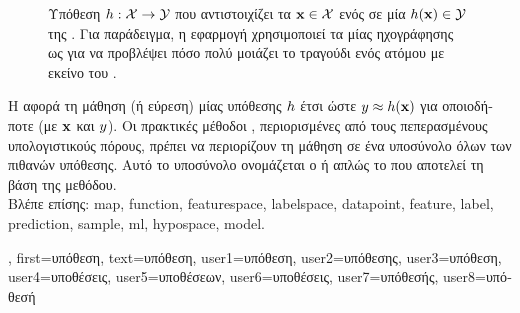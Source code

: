 {{\begin{figure}[H]
		{
		\caption{\label{fig:hypothesis_dict} \foreignlanguage{greek}{Υπόθεση $h: \mathcal{X} \rightarrow \mathcal{Y}$ που αντιστοιχίζει τα} 
			 ${\bf x} \in \mathcal{X}$ \foreignlanguage{greek}{ενός}  \foreignlanguage{greek}{σε μία} 
			 $h({\bf x}) \in \mathcal{Y}$ \foreignlanguage{greek}{της} . 
			\foreignlanguage{greek}{Για παράδειγμα, η εφαρμογή}   
			\foreignlanguage{greek}{χρησιμοποιεί τα}  \foreignlanguage{greek}{μίας ηχογράφησης ως} 
			 \foreignlanguage{greek}{για να προβλέψει πόσο πολύ μοιάζει το τραγούδι ενός ατόμου με εκείνο του} 
			. } }
		\end{figure}
		\foreignlanguage{greek}{Η}  \foreignlanguage{greek}{αφορά τη μάθηση (ή εύρεση) μίας}  
		\foreignlanguage{greek}{υπόθεσης $h$ έτσι ώστε $y \approx h({\bf x})$ 
		για οποιοδήποτε}  \foreignlanguage{greek}{(με}  ${\bf x}$ 
		\foreignlanguage{greek}{και}  $y$). \foreignlanguage{greek}{Οι πρακτικές μέθοδοι} , 
		\foreignlanguage{greek}{περιορισμένες από τους πεπερασμένους υπολογιστικούς πόρους, πρέπει να περιορίζουν τη μάθηση σε ένα 
		υποσύνολο όλων των πιθανών}  \foreignlanguage{greek}{υπόθεσης. Αυτό το υποσύνολο ονομάζεται ο} 
		 \foreignlanguage{greek}{ή απλώς το}  \foreignlanguage{greek}{που αποτελεί τη βάση της μεθόδου.} 
		\\
		\foreignlanguage{greek}{Βλέπε επίσης:} \gls{map}, \gls{function}, \gls{featurespace}, \gls{labelspace}, \gls{datapoint}, \gls{feature}, 
		\gls{label}, \gls{prediction}, \gls{sample}, \gls{ml}, \gls{hypospace}, \gls{model}.},
	first={\foreignlanguage{greek}{υπόθεση}},
	text={\foreignlanguage{greek}{υπόθεση}},
	user1={\foreignlanguage{greek}{υπόθεση}}, %
	user2={\foreignlanguage{greek}{υπόθεσης}}, %
	user3={\foreignlanguage{greek}{υπόθεση}}, %
	user4={\foreignlanguage{greek}{υποθέσεις}}, %
	user5={\foreignlanguage{greek}{υποθέσεων}}, %
	user6={\foreignlanguage{greek}{υποθέσεις}}, %
	user7={\foreignlanguage{greek}{υπόθεσής}}, %
	user8={\foreignlanguage{greek}{υπόθεσή}} %
}

